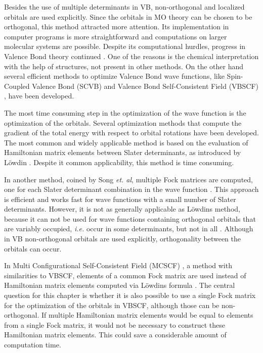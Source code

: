 Besides the use of multiple determinants in VB, non-orthogonal and localized orbitals are used explicitly. Since the orbitals in MO theory can be chosen to be orthogonal, this method attracted more attention. Its implementation in computer programs is more straightforward and computations on larger molecular systems are possible. Despite its computational hurdles, progress in Valence Bond theory continued \cite{vboverv1,vboverv2,vboverv3}. One of the reasons is the chemical interpretation with the help of structures, not present in other methods. On the other hand several efficient methods to optimize Valence Bond wave functions, like Spin-Coupled Valence Bond (SCVB) \cite{scvb1,scvb2,scvb3} and Valence Bond Self-Consistent Field (VBSCF) \cite{vbscf1,vbscf2,koos1,zahid}, have been developed.

The most time consuming step in the optimization of the wave function is the optimization of the orbitals. Several optimization methods that compute the gradient of the total energy with respect to orbital rotations have been developed. The most common and widely applicable method is based on the evaluation of Hamiltonian matrix elements between Slater determinants, as introduced by L\"{o}wdin \cite{lowdin}. Despite it common applicability, this method is time consuming.

In another method, coined by Song \textit{et. al}, multiple Fock matrices are computed, one for each Slater determinant combination in the wave function \cite{song}. This approach is efficient and works fast for wave functions with a small number of Slater determinants. However, it is not as generally applicable as L\"{o}wdins method, because it can not be used for wave functions containing orthogonal orbitals that are variably occupied, \textit{i.e.} occur in some determinants, but not in all \cite{xmvb}. Although in VB non-orthogonal orbitals are used explicitly, orthogonality between the orbitals can occur.

In Multi Configurational Self-Consistent Field (MCSCF) \cite{joop,mcscf,roos1,roos2}, a method with similarities to VBSCF, elements of a common Fock matrix are used instead of Hamiltonian matrix elements computed via L\"{o}wdins formula \cite{roos1}. The central question for this chapter is whether it is also possible to use a single Fock matrix for the optimization of the orbitals in VBSCF, although those can be non-orthogonal. If multiple Hamiltonian matrix elements would be equal to elements from a single Fock matrix, it would not be necessary to construct these Hamiltonian matrix elements. This could save a considerable amount of computation time.

